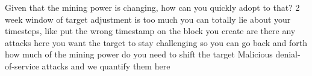 Given that the mining power is changing, how can you quickly adopt to that?
2 week window of target adjustment is too much
you can totally lie about your timesteps, like put the wrong timestamp on the block you create
are there any attacks here
you want the target to stay challenging so you can go back and forth
how much of the mining power do you need to shift the target
Malicious denial-of-service attacks and we quantify them here




%
